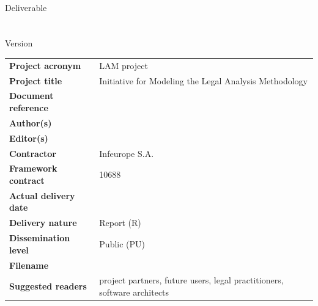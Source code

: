 \begin{titlepage}
\begin{center}
  \begin{spacing}{2.5}
    \textbf{\Huge \DelTitle}\\ \vspace{2cm}
    {\large Deliverable \DelNumber} \\ %
  {\large \DelAuthor} \\ %
  {\large \DelDate} \\ %
    {\large Version \DelVersion}
  \end{spacing}
  
  \vspace*{\fill}


\end{center}
\end{titlepage}

\clearpage


\setlength{\headheight}{1cm}
\setlength{\footskip}{18mm}
\addtolength{\textheight}{-\footskip}
\pagestyle{empty}

\clearpage



\vspace{6cm}

\begin{flushleft}
\begin{table}[!b]
\begin{tabular}{p{4.5cm}p{\textwidth-5cm}}
	\textbf{Project acronym}       &   LAM project\\
	\textbf{Project title}    &   Initiative for Modeling the Legal Analysis Methodology  \\ 
	\textbf{Document reference} 	&   \DelTitle \\	
	\textbf{Author(s)}             &   \DelAuthor \\
	\textbf{Editor(s)}             &   \DelAuthor \\
	\textbf{Contractor}    &   Infeurope S.A. \\
	\textbf{Framework contract}    &   10688 \\		
	\textbf{Actual delivery date}  &   \DelDate \\    
	\textbf{Delivery nature}     	&   Report (R) \\
	\textbf{Dissemination level} 	&   Public (PU) \\
	\textbf{Filename}           	&   \DelFilename\\
	\textbf{Suggested readers}    	&   project partners, future users, legal practitioners, software architects\\
\end{tabular}
\end{table}
\end{flushleft}



\clearpage

\clearpage





